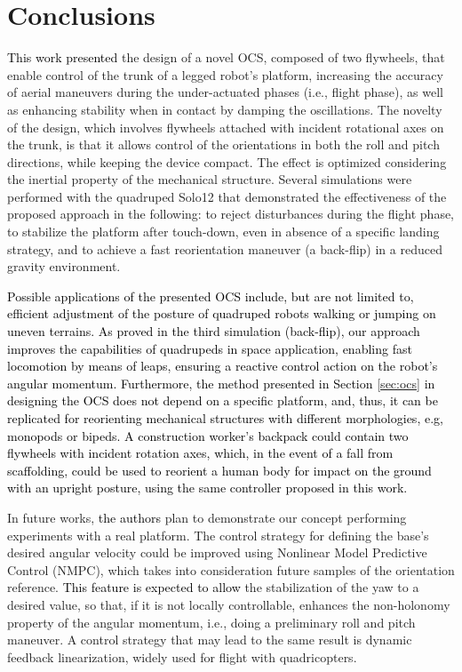 \documentclass[sensors,article,accept,pdftex,moreauthors]{Definitions/mdpi}
\newcommand{\MF}[1]{\textcolor{black}{#1}}
\begin{document}
\section{Conclusions}
\label{sec:conclusions}

\MF{This work presented} the design of a novel OCS, composed of two flywheels, that enable control of the trunk of a legged robot's platform, increasing the accuracy of aerial maneuvers during the under-actuated phases (i.e., flight phase), as well as enhancing stability when in contact by damping the oscillations. The novelty of the design, which involves flywheels attached with incident rotational axes on the trunk, is that it allows control of the orientations in both the roll and pitch directions, while keeping the device compact. The effect is optimized considering the inertial property of the mechanical structure. Several simulations were performed with the quadruped Solo12 that demonstrated the effectiveness of the proposed approach in the following: to reject disturbances during the flight phase, to stabilize the platform after touch-down, even in absence of a specific landing strategy, and to achieve a fast reorientation maneuver (a back-flip) in a reduced gravity environment. 

\MF{Possible applications of the presented OCS include, but are not limited to, efficient adjustment of the posture of quadruped robots walking or jumping on uneven terrains. As proved in the third simulation (back-flip), our approach improves the capabilities of quadrupeds in space application, enabling fast locomotion by means of leaps, ensuring a reactive control action on the robot's angular momentum. Furthermore, the method presented in Section \ref{sec:ocs} in designing the OCS does not depend on a specific platform, and, thus, it can be replicated for reorienting mechanical structures with different morphologies, e.g, monopods or bipeds. A construction worker's backpack could contain two flywheels with incident rotation axes, which, in the event of a fall from scaffolding, could be used to reorient a human body for impact on the ground with an upright posture, using the same controller proposed in this work.}

In future works, \MF{the authors} plan to demonstrate our concept performing experiments with a real platform. The control strategy for defining the base's desired angular velocity could be improved using  Nonlinear Model Predictive Control (NMPC), which takes into consideration future samples of the orientation reference.
\MF{This feature is expected to allow} the stabilization of the yaw to a desired value, so that, if it is not locally controllable, enhances the non-holonomy property of the angular momentum, i.e., doing a preliminary roll and pitch maneuver. 
A control strategy that may lead to the same result is dynamic feedback linearization, widely used for flight with quadricopters.
\end{document}
